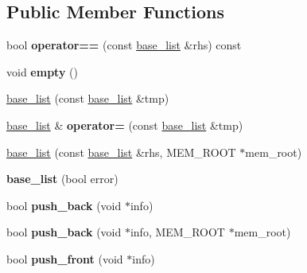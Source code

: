 \subsection*{Public Member Functions}
\begin{DoxyCompactItemize}
\item 
\mbox{\label{classbase__list_ab3bc6913d78bce50142783bd8834f9e8}} 
bool {\bfseries operator==} (const \mbox{\hyperlink{classbase__list}{base\+\_\+list}} \&rhs) const
\item 
\mbox{\label{classbase__list_ad11dad8c428de9a770fcdc708c1a058f}} 
void {\bfseries empty} ()
\item 
\mbox{\hyperlink{classbase__list_a24d6d72225c4f733291ddaca494cf84a}{base\+\_\+list}} (const \mbox{\hyperlink{classbase__list}{base\+\_\+list}} \&tmp)
\item 
\mbox{\label{classbase__list_a80344dfb97b5355f62984bb57a292a4f}} 
\mbox{\hyperlink{classbase__list}{base\+\_\+list}} \& {\bfseries operator=} (const \mbox{\hyperlink{classbase__list}{base\+\_\+list}} \&tmp)
\item 
\mbox{\hyperlink{classbase__list_a3a29753a509aeb6df2ea457796fab004}{base\+\_\+list}} (const \mbox{\hyperlink{classbase__list}{base\+\_\+list}} \&rhs, M\+E\+M\+\_\+\+R\+O\+OT $\ast$mem\+\_\+root)
\item 
\mbox{\label{classbase__list_aaba06a42b7fa3290600c8c0494903f43}} 
{\bfseries base\+\_\+list} (bool error)
\item 
\mbox{\label{classbase__list_a0f84912f81a0db456b03c4c457485ba5}} 
bool {\bfseries push\+\_\+back} (void $\ast$info)
\item 
\mbox{\label{classbase__list_a64f7a8472d00005d55451482641a24d5}} 
bool {\bfseries push\+\_\+back} (void $\ast$info, M\+E\+M\+\_\+\+R\+O\+OT $\ast$mem\+\_\+root)
\item 
\mbox{\label{classbase__list_a3d594fbbb23c7b5030fd2f3e7126fb61}} 
bool {\bfseries push\+\_\+front} (void $\ast$info)
\item 
\mbox{\label{classbase__list_afd5da65506b5c7f83707a64ea1268586}} 

\end{DoxyCompactItemize}
